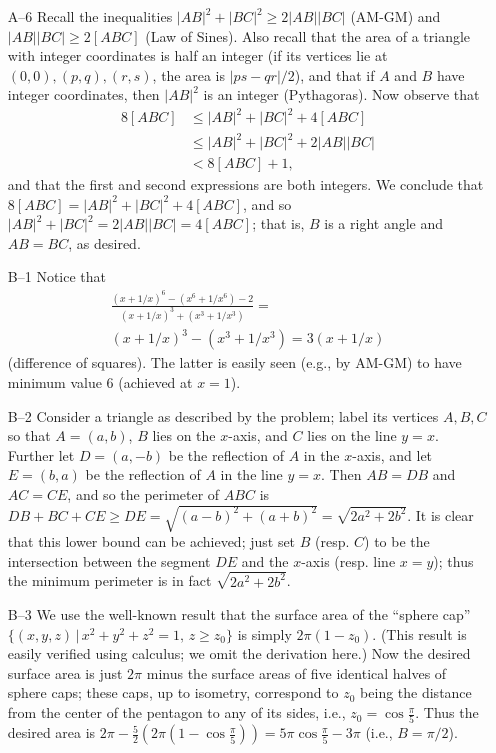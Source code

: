 \documentclass[amssymb,twocolumn,pra,10pt,aps]{revtex4-1}
\begin{document}
\begin{itemize}
\item[A--6]
Recall the inequalities $|AB|^2 + |BC|^2 \geq 2|AB||BC|$ (AM-GM)
and $|AB||BC| \geq 2[ABC]$ (Law of Sines). Also recall that the area of
a triangle with integer coordinates is half an integer
(if its vertices lie at $(0,0), (p,q), (r,s)$, the area is
$|ps-qr|/2$), and that if $A$ and $B$ have integer coordinates, then
$|AB|^2$
is an integer (Pythagoras). Now observe that
\begin{align*}
8[ABC] &\leq |AB|^2+|BC|^2 + 4[ABC] \\
&\leq |AB|^2 + |BC|^2 + 2|AB| |BC| \\
&< 8[ABC]+1,
\end{align*}
and that the first and second expressions are both integers.
We conclude that
$8[ABC] = |AB|^2+ |BC|^2+4[ABC]$, and so $|AB|^2+|BC|^2 =
2|AB| |BC|
= 4[ABC]$; that is, $B$ is a right angle and $AB=BC$, as desired.

\item[B--1]
Notice that
\begin{gather*}
\frac{(x+1/x)^6-(x^6+1/x^6)-2}{(x+1/x)^3+(x^3+1/x^3)} = \\
(x+1/x)^3-(x^3+1/x^3)=3(x+1/x)
\end{gather*}
(difference of squares).  The latter is easily seen
(e.g., by AM-GM) to have minimum value 6
(achieved at $x=1$).

\item[B--2]
Consider a triangle as described by the problem; label its
vertices $A,B,C$ so that $A = (a,b)$, $B$ lies on the $x$-axis,
and $C$ lies on the line $y=x$.  Further let $D = (a,-b)$ be the
reflection of $A$ in the $x$-axis, and let $E = (b,a)$ be
the reflection of $A$ in the line $y=x$.  Then $AB=DB$
and $AC=CE$, and so the perimeter of $ABC$ is
$DB+BC+CE \geq DE = \sqrt{(a-b)^2 + (a+b)^2}
= \sqrt{2a^2+2b^2}$.  It is clear that this lower bound can
be achieved; just set $B$ (resp. $C$) to be the
intersection between the segment $DE$ and the $x$-axis (resp.
line $x=y$); thus the minimum perimeter is in fact
$\sqrt{2a^2+2b^2}$.

\item[B--3]
We use the well-known result that the surface area of the
``sphere cap'' $\{(x,y,z)\,|\,x^2+y^2+z^2=1,\,z\geq z_0\}$ is
simply $2\pi(1-z_0)$.  (This result is easily verified using
calculus; we omit the derivation here.)  Now the desired surface
area is just $2\pi$ minus the surface areas of five identical
halves of sphere caps; these caps, up to isometry, correspond
to $z_0$ being the distance from the center of the pentagon
to any of its sides, i.e., $z_0 = \cos \frac{\pi}{5}$.  Thus
the desired area is
$2\pi - \frac{5}{2} \left(2\pi (1-\cos\frac{\pi}{5})\right)
= 5\pi\cos\frac{\pi}{5} - 3\pi$ (i.e., $B=\pi/2$).


\end{itemize}
\end{document}
